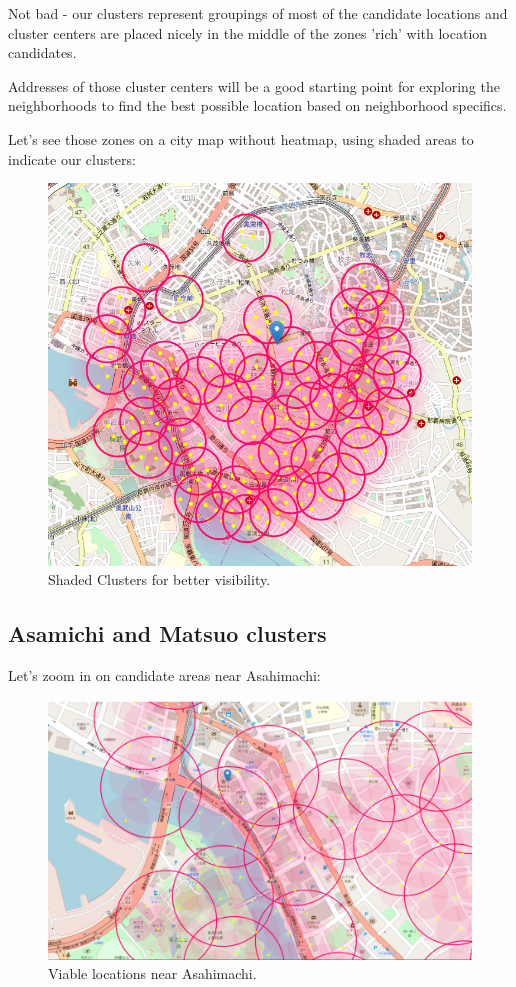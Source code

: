\documentclass[11pt]{article}
\begin{document}
Not bad - our clusters represent groupings of most of the candidate locations and cluster centers are placed nicely in the middle of the zones 'rich' with location candidates.

Addresses of those cluster centers will be a good starting point for exploring the neighborhoods to find the best possible location based on neighborhood specifics.

Let's see those zones on a city map without heatmap, using shaded areas to indicate our clusters:

\begin{figure}[H]
    \centering
        \includegraphics[scale=.4]{figures/cm11.png}
    \caption{ Shaded Clusters for better visibility.}
    \label{fig:1}
\end{figure}

\subsection{Asamichi and Matsuo clusters}

Let's zoom in on candidate areas near Asahimachi:

\begin{figure}[H]
    \centering
        \includegraphics[scale=.4]{figures/cm12.png}
    \caption{ Viable locations near Asahimachi.}
    \label{fig:1}
\end{figure}
\end{document}
